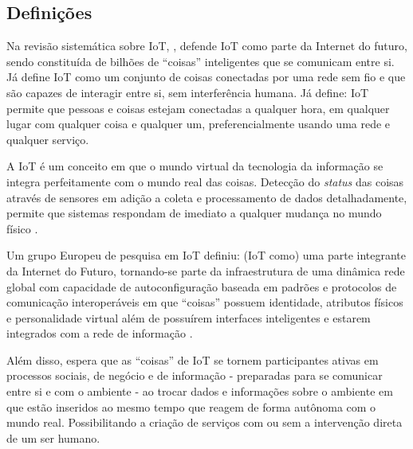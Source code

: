 
\subsection{Definições} \label{subsec:iot-definicoes}

Na revisão sistemática sobre IoT, , defende IoT como
parte da Internet do futuro, sendo constituída de bilhões de ``coisas''
inteligentes que se comunicam entre si. Já  define
IoT como um conjunto de coisas conectadas por uma rede sem fio e que são
capazes de interagir entre si, sem interferência humana. Já
 define: IoT permite que pessoas e coisas
estejam conectadas a qualquer hora, em qualquer lugar com qualquer coisa e
qualquer um, preferencialmente usando uma rede e qualquer serviço.


A IoT é um conceito em que o mundo virtual da tecnologia da informação se 
integra perfeitamente com o mundo real das coisas. Detecção do \textit{status}
das coisas através de sensores em adição a coleta e processamento de dados
detalhadamente, permite que sistemas respondam de imediato a qualquer mudança
no mundo físico \cite{uckelmann2011architectural}.

Um grupo Europeu de pesquisa em IoT definiu: (IoT como) uma parte integrante da
Internet do Futuro, tornando-se parte da infraestrutura de uma dinâmica rede
global com capacidade de autoconfiguração baseada em padrões e protocolos
de comunicação interoperáveis em que ``coisas'' possuem identidade, atributos
físicos e personalidade virtual além de possuírem interfaces inteligentes e
estarem integrados com a rede de informação \cite{cerpiot2009}.

Além disso,  espera que as ``coisas''
de IoT se tornem participantes ativas em processos sociais, de negócio e de 
informação - preparadas para se comunicar entre si e com o ambiente -
ao trocar dados e informações sobre o ambiente em que estão inseridos ao mesmo
tempo que reagem de forma autônoma com o mundo real. Possibilitando a criação
de serviços com ou sem a intervenção direta de um ser humano.

